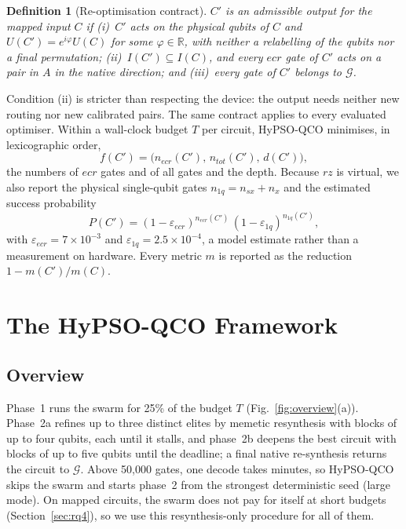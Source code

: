 \documentclass[conference,letterpaper]{IEEEtran}
\newcommand{\hypso}{HyPSO-QCO}
\newtheorem{definition}{Definition}
\begin{document}
\begin{definition}[Re-optimisation contract]
$C'$ is an admissible output for the mapped input $C$ if (i)~$C'$ acts on the physical qubits of $C$ and
$U(C') = e^{i\varphi}U(C)$ for some $\varphi\in\mathbb{R}$, with neither a relabelling of the qubits nor a
final permutation; (ii)~$I(C')\subseteq I(C)$, and every $ecr$ gate of $C'$ acts on a pair in $A$ in the
native direction; and (iii)~every gate of $C'$ belongs to $\mathcal{G}$.
\end{definition}

Condition (ii) is stricter than respecting the device: the output needs neither new routing nor new
calibrated pairs. The same contract applies to every evaluated optimiser. Within a wall-clock budget $T$ per
circuit, \hypso{} minimises, in lexicographic order,
\begin{equation}
f(C') = \bigl(n_{ecr}(C'),\, n_{tot}(C'),\, d(C')\bigr),
\end{equation}
the numbers of $ecr$ gates and of all gates and the depth. Because $rz$ is virtual, we also report the
physical single-qubit gates $n_{1q} = n_{sx} + n_{x}$ and the estimated success probability
\begin{equation}
P(C') = (1-\varepsilon_{ecr})^{n_{ecr}(C')}\,(1-\varepsilon_{1q})^{n_{1q}(C')},
\end{equation}
with $\varepsilon_{ecr} = 7\times10^{-3}$ and $\varepsilon_{1q} = 2.5\times10^{-4}$, a model estimate rather
than a measurement on hardware. Every metric $m$ is reported as the reduction $1 - m(C')/m(C)$.

\section{The HyPSO-QCO Framework}

\subsection{Overview}
Phase~1 runs the swarm for 25\% of the budget $T$ (Fig.~\ref{fig:overview}(a)). Phase~2a refines up to three
distinct elites by memetic resynthesis with blocks of up to four qubits, each until it stalls, and phase~2b
deepens the best circuit with blocks of up to five qubits until the deadline; a final native re-synthesis
returns the circuit to $\mathcal{G}$. Above 50,000 gates, one decode takes minutes, so \hypso{} skips the
swarm and starts phase~2 from the strongest deterministic seed (large mode). On mapped circuits, the swarm
does not pay for itself at short budgets (Section~\ref{sec:rq4}), so we use this resynthesis-only procedure
for all of them.
\end{document}
